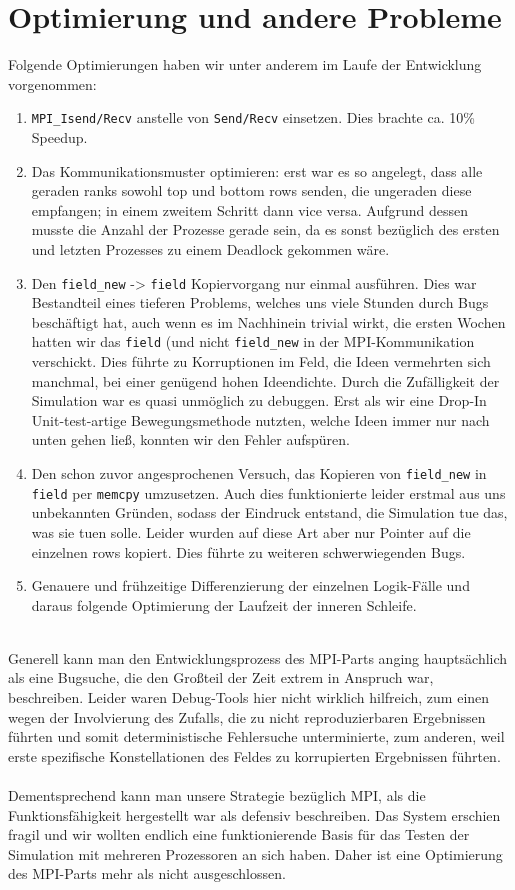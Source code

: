 \section{Optimierung und andere Probleme}
Folgende Optimierungen haben wir unter anderem im Laufe der Entwicklung vorgenommen:
\begin{enumerate}
	\item \texttt{MPI\_Isend/Recv} anstelle von \texttt{Send/Recv} einsetzen.
Dies brachte ca. 10\% Speedup.
  \item Das Kommunikationsmuster optimieren: erst war es so angelegt, dass alle geraden ranks sowohl top und bottom rows senden, die ungeraden diese empfangen; in einem zweitem Schritt dann vice versa. Aufgrund dessen musste die Anzahl der Prozesse gerade sein, da es sonst bezüglich des ersten und letzten Prozesses zu einem Deadlock gekommen wäre.
	\item Den \texttt{field\_new} -\textgreater{} \texttt{field} Kopiervorgang nur einmal ausführen.
Dies war Bestandteil eines tieferen Problems, welches uns viele Stunden durch Bugs beschäftigt hat, auch wenn es im Nachhinein trivial wirkt, die ersten Wochen hatten wir das \texttt{field} (und nicht \texttt{field\_new} in der MPI-Kommunikation verschickt.
Dies führte zu Korruptionen im Feld, die Ideen vermehrten sich manchmal, bei einer genügend hohen Ideendichte.
Durch die Zufälligkeit der Simulation war es quasi unmöglich zu debuggen.
Erst als wir eine Drop-In Unit-test-artige Bewegungsmethode nutzten, welche Ideen immer nur nach unten gehen ließ, konnten wir den Fehler aufspüren.
	\item Den schon zuvor angesprochenen Versuch, das Kopieren von \texttt{field\_new} in \texttt{field} per \texttt{memcpy} umzusetzen.
Auch dies funktionierte leider erstmal aus uns unbekannten Gründen, sodass der Eindruck entstand, die Simulation tue das, was sie tuen solle.
Leider wurden auf diese Art aber nur Pointer auf die einzelnen rows kopiert. Dies führte zu weiteren schwerwiegenden Bugs.
	\item Genauere und frühzeitige Differenzierung der einzelnen Logik-Fälle und daraus folgende Optimierung der Laufzeit der inneren Schleife.
\end{enumerate}
\quad \\
Generell kann man den Entwicklungsprozess des MPI-Parts anging hauptsächlich als eine Bugsuche, die den Großteil der Zeit extrem in Anspruch war, beschreiben.
Leider waren Debug-Tools hier nicht wirklich hilfreich, zum einen wegen der Involvierung des Zufalls, die zu nicht reproduzierbaren Ergebnissen führten und somit deterministische Fehlersuche unterminierte, zum anderen, weil erste spezifische Konstellationen des Feldes zu korrupierten Ergebnissen führten. \\
\quad \\
Dementsprechend kann man unsere Strategie bezüglich MPI, als die Funktionsfähigkeit hergestellt war als defensiv beschreiben.
Das System erschien fragil und wir wollten endlich eine funktionierende Basis für das Testen der Simulation mit mehreren Prozessoren an sich haben.
Daher ist eine Optimierung des MPI-Parts mehr als nicht ausgeschlossen.

